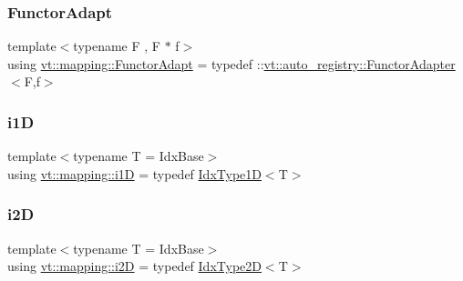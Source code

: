 \mbox{\label{namespacevt_1_1mapping_a9502cb3a918b8389f64351638edab39f}} 
\subsubsection{\texorpdfstring{Functor\+Adapt}{FunctorAdapt}}
{\footnotesize\ttfamily template$<$typename F , F $\ast$ f$>$ \\
using \hyperlink{namespacevt_1_1mapping_a9502cb3a918b8389f64351638edab39f}{vt\+::mapping\+::\+Functor\+Adapt} = typedef \+::\hyperlink{structvt_1_1auto__registry_1_1_functor_adapter}{vt\+::auto\+\_\+registry\+::\+Functor\+Adapter}$<$F,f$>$}

\mbox{\label{namespacevt_1_1mapping_af0c14a9a77e0311b3d089143ed93ba76}} 
\subsubsection{\texorpdfstring{i1D}{i1D}}
{\footnotesize\ttfamily template$<$typename T  = Idx\+Base$>$ \\
using \hyperlink{namespacevt_1_1mapping_af0c14a9a77e0311b3d089143ed93ba76}{vt\+::mapping\+::i1D} = typedef \hyperlink{namespacevt_a36127c6500f2311908c959be653da40e}{Idx\+Type1D}$<$T$>$}

\mbox{\label{namespacevt_1_1mapping_a6448c875e0807b43f31e96fc5b0cec04}} 
\subsubsection{\texorpdfstring{i2D}{i2D}}
{\footnotesize\ttfamily template$<$typename T  = Idx\+Base$>$ \\
using \hyperlink{namespacevt_1_1mapping_a6448c875e0807b43f31e96fc5b0cec04}{vt\+::mapping\+::i2D} = typedef \hyperlink{namespacevt_ab0fbc5ddf69b5aa0ed6a8d1658b504eb}{Idx\+Type2D}$<$T$>$}

\mbox{\label{namespacevt_1_1mapping_af435b967b9ed1ccb5ec4effdbd9abd13}} 
